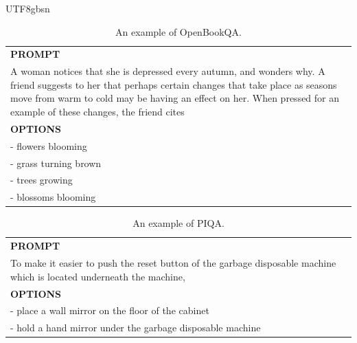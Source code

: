 \documentclass[11pt, a4paper, logo, copyright, nonumbering]{deepseek}
\begin{document}
\begin{CJK*}{UTF8}{gbsn}
\begin{table}[ht]
    \centering \small
\begin{tabular}{p{12cm}}
\toprule
\textbf{PROMPT}\\
A woman notices that she is depressed every autumn, and wonders why. A friend suggests to her that perhaps certain changes that take place as seasons move from warm to cold may be having an effect on her. When pressed for an example of these changes, the friend cites\\
\midrule
\textbf{OPTIONS}\\
- flowers blooming\\
- grass turning brown\\
- trees growing\\
- blossoms blooming\\
\bottomrule
\end{tabular}
    \caption{\centering An example of OpenBookQA.}
    \label{tab:openbookqa_eval_format_example}
\end{table}

\begin{table}[ht]
    \centering \small
\begin{tabular}{p{12cm}}
\toprule
\textbf{PROMPT}\\
To make it easier to push the reset button of the garbage disposable machine which is located underneath the machine,\\
\midrule
\textbf{OPTIONS}\\
- place a wall mirror on the floor of the cabinet\\
- hold a hand mirror under the garbage disposable machine\\
\bottomrule
\end{tabular}
    \caption{\centering An example of PIQA.}
    \label{tab:PIQA_eval_format_example}
\end{table}


\end{CJK*}
\end{document}
